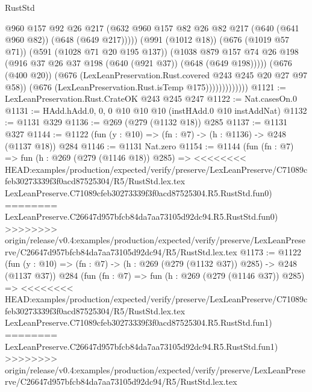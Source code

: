 \begin{lexlean}{RustStd}
\begin{coremodule}
{\begin{coremodule}
{{{{{{                                @960
                                @157
                                @92
                                @26
                                @217
                                (@632
                                  @960
                                  @157
                                  @82
                                  @26
                                  @82
                                  @217
                                  (@640 (@641 @960 @82))
                                  (@648 (@649 @217)))))
                            (@991 (@1012 @18))
                            (@676 (@1019 @57 @71))
                            (@591 (@1028 @71 @20 @195 @137))
                            (@1038
                              @879
                              @157
                              @74
                              @26
                              @198
                              (@916 @37 @26 @37 @198 (@640 (@921 @37)) (@648 (@649 @198)))))
                          (@676 (@400 @20))
                          (@676 (LexLeanPreservation.Rust.covered @243 @245 @20 @27 @97 @58))
                          (@676 (LexLeanPreservation.Rust.isTemp @175)))))))))))))
@1121 := LexLeanPreservation.Rust.CrateOK @243 @245 @247
@1122 := Nat.casesOn.{0}
@1131 := HAdd.hAdd.{0, 0, 0} @10 @10 @10 (instHAdd.{0} @10 instAddNat)
@1132 := @1131 @329
@1136 := @269 (@279 (@1132 @18)) @285
@1137 := @1131 @327
@1144 := @1122 (fun (y : @10) => (fn : @7) -> (h : @1136) -> @248 (@1137 @18)) @284
@1146 := @1131 Nat.zero
@1154 := @1144
    (fun (fn : @7) =>
    fun (h : @269 (@279 (@1146 @18)) @285) =>
<<<<<<<< HEAD:examples/production/expected/verify/preserve/LexLeanPreserve/C71089cfeb30273339f3f0acd87525304/R5/RustStd.lex.tex
    LexLeanPreserve.C71089cfeb30273339f3f0acd87525304.R5.RustStd.fun0)
========
    LexLeanPreserve.C26647d957bfcb84da7aa73105d92dc94.R5.RustStd.fun0)
>>>>>>>> origin/release/v0.4:examples/production/expected/verify/preserve/LexLeanPreserve/C26647d957bfcb84da7aa73105d92dc94/R5/RustStd.lex.tex
@1173 := @1122
    (fun (y : @10) => (fn : @7) -> (h : @269 (@279 (@1132 @37)) @285) -> @248 (@1137 @37))
    @284
    (fun (fn : @7) =>
    fun (h : @269 (@279 (@1146 @37)) @285) =>
<<<<<<<< HEAD:examples/production/expected/verify/preserve/LexLeanPreserve/C71089cfeb30273339f3f0acd87525304/R5/RustStd.lex.tex
    LexLeanPreserve.C71089cfeb30273339f3f0acd87525304.R5.RustStd.fun1)
========
    LexLeanPreserve.C26647d957bfcb84da7aa73105d92dc94.R5.RustStd.fun1)
>>>>>>>> origin/release/v0.4:examples/production/expected/verify/preserve/LexLeanPreserve/C26647d957bfcb84da7aa73105d92dc94/R5/RustStd.lex.tex
}}}}}}
\end{coremodule}}
\end{coremodule}
\end{lexlean}
